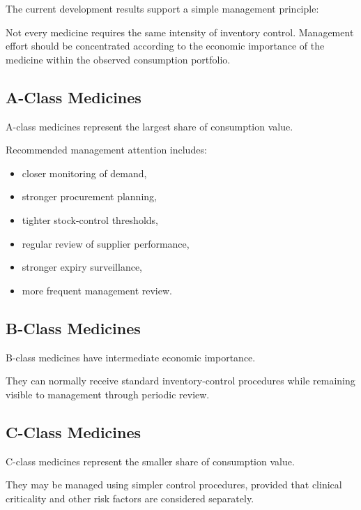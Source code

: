 \documentclass[12pt]{article}
\begin{document}
The current development results support a simple management principle:

\begin{tcolorbox}[
    colback=goldColor!8,
    colframe=goldColor,
    title=\textbf{Management Principle},
    breakable
]
Not every medicine requires the same intensity of inventory control.
Management effort should be concentrated according to the economic importance
of the medicine within the observed consumption portfolio.
\end{tcolorbox}

\subsection{A-Class Medicines}

A-class medicines represent the largest share of consumption value.

Recommended management attention includes:

\begin{itemize}
    \item closer monitoring of demand,
    \item stronger procurement planning,
    \item tighter stock-control thresholds,
    \item regular review of supplier performance,
    \item stronger expiry surveillance,
    \item more frequent management review.
\end{itemize}

\subsection{B-Class Medicines}

B-class medicines have intermediate economic importance.

They can normally receive standard inventory-control procedures while remaining
visible to management through periodic review.

\subsection{C-Class Medicines}

C-class medicines represent the smaller share of consumption value.

They may be managed using simpler control procedures, provided that clinical
criticality and other risk factors are considered separately.
\end{document}
